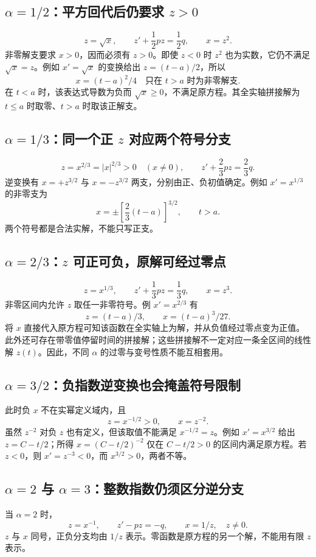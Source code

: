 \documentclass[11pt,a4paper]{ctexart}
\begin{document}
\subsection{$\alpha=1/2$：平方回代后仍要求 $z>0$}
\[
z=\sqrt x,\qquad z'+\frac12pz=\frac12q,\qquad x=z^2.
\]
非零解支要求 $x>0$，因而必须有 $z>0$。即使 $z<0$ 时 $z^2$ 也为实数，它仍不满足 $\sqrt x=z$。例如 $x'=\sqrt x$ 的变换给出 $z=(t-a)/2$，所以
\[
x=(t-a)^2/4\quad\text{只在 }t>a\text{ 时为非零解支}.
\]
在 $t<a$ 时，该表达式导数为负而 $\sqrt x\ge0$，不满足原方程。其全实轴拼接解为 $t\le a$ 时取零、$t>a$ 时取该正解支。

\subsection{$\alpha=1/3$：同一个正 $z$ 对应两个符号分支}
\[
z=x^{2/3}=|x|^{2/3}>0\quad(x\ne0),\qquad
z'+\frac23pz=\frac23q.
\]
逆变换有 $x=+z^{3/2}$ 与 $x=-z^{3/2}$ 两支，分别由正、负初值确定。例如 $x'=x^{1/3}$ 的非零支为
\[
x=\pm\left[\frac23(t-a)\right]^{3/2},\qquad t>a.
\]
两个符号都是合法实解，不能只写正支。

\subsection{$\alpha=2/3$：$z$ 可正可负，原解可经过零点}
\[
z=x^{1/3},\qquad z'+\frac13pz=\frac13q,\qquad x=z^3.
\]
非零区间内允许 $z$ 取任一非零符号。例 $x'=x^{2/3}$ 有
\[
z=(t-a)/3,\qquad x=(t-a)^3/27.
\]
将 $x$ 直接代入原方程可知该函数在全实轴上为解，并从负值经过零点变为正值。此外还可存在带零值停留时间的拼接解；这些拼接解不一定对应一条全区间的线性解 $z(t)$。因此，不同 $\alpha$ 的过零与变号性质不能互相套用。

\subsection{$\alpha=3/2$：负指数逆变换也会掩盖符号限制}
此时负 $x$ 不在实幂定义域内，且
\[
z=x^{-1/2}>0,\qquad x=z^{-2}.
\]
虽然 $z^{-2}$ 对负 $z$ 也有定义，但该取值不能满足 $x^{-1/2}=z$。例如 $x'=x^{3/2}$ 给出 $z=C-t/2$；所得 $x=(C-t/2)^{-2}$ 仅在 $C-t/2>0$ 的区间内满足原方程。若 $z<0$，则 $x'=z^{-3}<0$，而 $x^{3/2}>0$，两者不等。

\subsection{$\alpha=2$ 与 $\alpha=3$：整数指数仍须区分逆分支}
当 $\alpha=2$ 时，
\[
z=x^{-1},\qquad z'-pz=-q,\qquad x=1/z,\quad z\ne0.
\]
$z$ 与 $x$ 同号，正负分支均由 $1/z$ 表示。零函数是原方程的另一个解，不能用有限 $z$ 表示。
\end{document}
